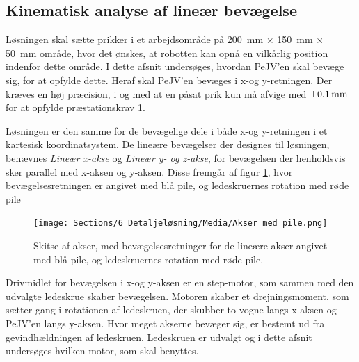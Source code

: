 
\subsection{Kinematisk analyse af lineær bevægelse} \label{Kinematisk analyse}
Løsningen skal sætte prikker i et arbejdsområde på \SI{200}{mm} \(\times\) \SI{150}{mm} \(\times\) \SI{50}{mm} område, hvor det ønskes, at robotten kan opnå en vilkårlig position indenfor dette område. I dette afsnit undersøges, hvordan PeJV'en skal bevæge sig, for at opfylde dette. Heraf skal PeJV'en bevæges i x-og y-retningen. Der kræves en høj præcision, i og med at en påsat prik kun må afvige med $\SI{\pm0,1}{mm}$ for at opfylde præstationskrav 1.

Løsningen er den samme for de bevægelige dele i både x-og y-retningen i et kartesisk koordinatsystem. De lineære bevægelser der designes til løsningen, benævnes \textit{ Lineær x-akse} og \textit{Lineær y- og z-akse}, for bevægelsen der henholdsvis sker parallel med x-aksen og y-aksen. Disse fremgår af figur \ref{Skite af akser med pile}, hvor bevægelsesretningen er angivet med blå pile, og ledeskruernes rotation med røde pile

\begin{figure}[H]
    \centering
    \texttt{[image: Sections/6 Detaljeløsning/Media/Akser med pile.png]}
    \caption{Skitse af akser, med bevægelsesretninger for de lineære akser angivet med blå pile, og ledeskruernes rotation med røde pile.}
    \label{Skite af akser med pile}
\end{figure}

Drivmidlet for bevægelsen i x-og y-aksen er en step-motor, som sammen med den udvalgte ledeskrue skaber bevægelsen. Motoren skaber et drejningsmoment, som sætter gang i rotationen af ledeskruen, der skubber to vogne langs x-aksen og PeJV'en langs y-aksen. Hvor meget akserne bevæger sig, er bestemt ud fra gevindhældningen af ledeskruen. Ledeskruen er udvalgt og i dette afsnit undersøges hvilken motor, som skal benyttes.


